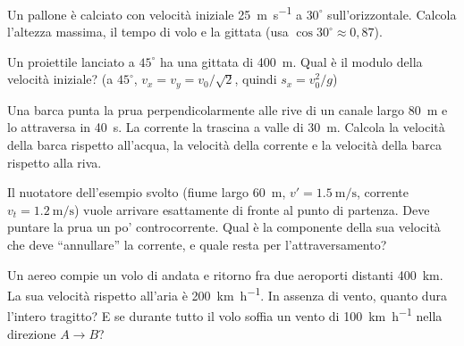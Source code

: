 \begin{esercizio}
Un pallone è calciato con velocità iniziale \SI{25}{\metre\per\second} a $30^\circ $ sull'orizzontale. Calcola l'altezza massima, il tempo di volo e la gittata (usa $\cos 30^\circ  \approx 0,87$).\\
\end{esercizio}

\begin{esercizio}
Un proiettile lanciato a $45^\circ $ ha una gittata di \SI{400}{\metre}. Qual è il modulo della velocità iniziale? (a $45^\circ $, $v_x = v_y = v_0/\sqrt2$, quindi $s_x = v_0^2/g$)\\
\end{esercizio}

\begin{esercizio}
Una barca punta la prua perpendicolarmente alle rive di un canale largo \SI{80}{\metre} e lo attraversa in \SI{40}{\second}. La corrente la trascina a valle di \SI{30}{\metre}. Calcola la velocità della barca rispetto all'acqua, la velocità della corrente e la velocità della barca rispetto alla riva.\\
\end{esercizio}

\begin{esercizio}
Il nuotatore dell'esempio svolto (fiume largo \SI{60}{\metre}, $v' = \SI{1,5}{\metre\per\second}$, corrente $v_t = \SI{1,2}{\metre\per\second}$) vuole arrivare esattamente di fronte al punto di partenza. Deve puntare la prua un po' controcorrente. Qual è la componente della sua velocità che deve ``annullare'' la corrente, e quale resta per l'attraversamento?\\
\end{esercizio}

\begin{esercizio}
Un aereo compie un volo di andata e ritorno fra due aeroporti distanti \SI{400}{\kilo\metre}. La sua velocità rispetto all'aria è \SI{200}{\kilo\metre\per\hour}. In assenza di vento, quanto dura l'intero tragitto? E se durante tutto il volo soffia un vento di \SI{100}{\kilo\metre\per\hour} nella direzione $A \to B$?\\
\end{esercizio}


